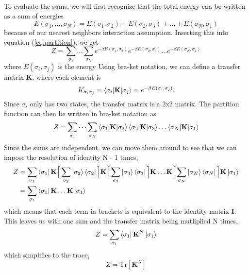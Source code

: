\documentclass{article}
\newcommand{\be}{\begin{equation}}
\newcommand{\ee}{\end{equation}}
\newcommand{\tk}{\textbf{K}}
\newcommand{\ti}{\textbf{I}}
\begin{document}
To evaluate the sums, we will first recognize that the total energy can be written as a sum of energies
\be
  E(\sigma_1, \dots, \sigma_N) = E(\sigma_1, \sigma_2) + E(\sigma_2, \sigma_3) + \dots + E(\sigma_N, \sigma_1)
\ee
because of our nearest neighbors interaction assumption.
Inserting this into equation (\ref{eq:partition}), we get
\be
  Z = \sum_{\sigma_1} \dots \sum_{\sigma_N} e^{-\beta E(\sigma_1, \sigma_2)} e^{-\beta E(\sigma_2, \sigma_3)} \dots e^{- \beta E(\sigma_N, \sigma_1)}
\ee
where $E(\sigma_i, \sigma_j)$ is the energy
Using bra-ket notation, we can define a transfer matrix \textbf{K}, where each element is
\be
  K_{\sigma_i \sigma_j} = \braket{\sigma_i | \tk | \sigma_j} = e^{- \beta E(\sigma_i, \sigma_j)} .
\ee
Since $\sigma_i$ only has two states, the transfer matrix is a 2x2 matrix.
The partition function can then be written in bra-ket notation as
\be
  Z = \sum_{\sigma_1} \dots \sum_{\sigma_N} \braket{\sigma_1 | \tk | \sigma_2} \braket{\sigma_2 | \tk | \sigma_3} \dots \braket{\sigma_N | \tk | \sigma_1}
\ee
Since the sums are independent, we can move them around to see that we can impose the resolution of identity N - 1 times,
\be
  \begin{split}
    Z &= \sum_{\sigma_1} \bra{\sigma_1} \tk \Big[ \sum_{\sigma_2} \ket{\sigma_2} \bra{\sigma_2} \Big] \tk \Big[ \sum_{\sigma_3} \ket{\sigma_3} \bra{\sigma_3} \Big] \tk \dots \tk \Big[ \sum_{\sigma_N} \ket{\sigma_N} \bra{\sigma_N} \Big] \tk \ket{\sigma_1} \\
    &= \sum_{\sigma_1} \bra{\sigma_1} \tk \dots \tk \ket{\sigma_1}
  \end{split}
\ee
which means that each term in brackets is equivalent to the identity matrix \ti.
This leaves us with one sum and the transfer matrix being mutliplied N times,
\be
  Z = \sum_{\sigma_1} \bra{\sigma_1} \tk^N \ket{\sigma_1}
\ee
which simplifies to the trace,
\be
  Z = \text{Tr}[\tk^N]
\ee


\end{document}
